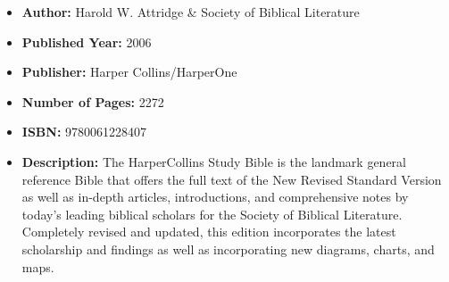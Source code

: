 \documentclass{tufte-handout}
\begin{document}
\begin{itemize}
    \item[] \textbf{Author:} Harold W. Attridge \& Society of Biblical Literature
    \item[] \textbf{Published Year:} 2006 
    \item[] \textbf{Publisher:} Harper Collins/HarperOne
    \item[] \textbf{Number of Pages:} 2272      
    \item[] \textbf{ISBN:} 9780061228407
    \item[] \textbf{Description:} The HarperCollins Study Bible is the landmark general reference Bible that offers the full text of the New Revised Standard Version as well as in-depth articles, introductions, and comprehensive notes by today's leading biblical scholars for the Society of Biblical Literature. Completely revised and updated, this edition incorporates the latest scholarship and findings as well as incorporating new diagrams, charts, and maps.
\end{itemize}
\end{document}
